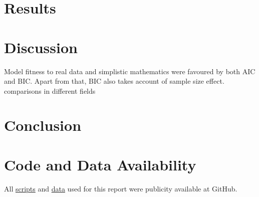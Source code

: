 \documentclass[a4paper, 11pt]{article}
\begin{document}
	\section*{Results}
	
	\section*{Discussion}
	Model fitness to real data and simplistic mathematics were favoured by both AIC\autocite{johnson2004model,akaike1998information,burnhamdr} and BIC\autocite{johnson2004model,turchin2003complex}.  Apart from that, BIC also takes account of sample size effect\autocite{johnson2004model,turchin2003complex}.\\
	comparisons in different fields\autocite{kuha2004aic,aho2014model,yang2005can,vrieze2012model,wang2006comparison,acquah2010comparison}
	
	\section*{Conclusion}
	
	\section*{Code and Data Availability}
	All \href{https://github.com/ph-u/CMEECourseWork_pmH/tree/master/MiniProject/code}{scripts} and \href{https://github.com/ph-u/CMEECourseWork_pmH/tree/master/MiniProject/data}{data} used for this report were publicity available at GitHub.
	\nocite{*}\printbibliography
\end{document}
